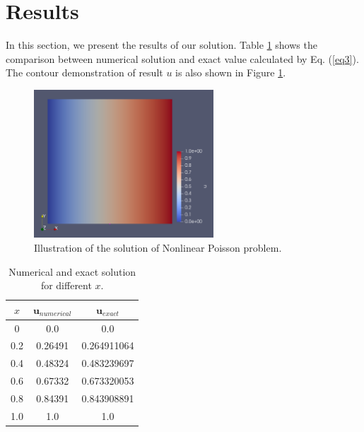 \documentclass[]{article}
\begin{document}
\section{Results} \label{sec: rst}
In this section, we present the results of our solution. Table \ref{tab1} shows the comparison between numerical solution and exact value calculated by Eq. (\ref{eq3}). The contour demonstration of result $u$ is also shown in Figure \ref{fig_Rs}.

\begin{figure}[htbp]
	\centering
	\includegraphics[width=0.6\textwidth]{Figures/result.png}
	\caption{Illustration of the solution of Nonlinear Poisson problem.}
	\label{fig_Rs}
\end{figure}
\begin{table}
	\caption{Numerical and exact solution for different $x$.}
	\label{tab1}
	\begin{center}
		\begin{tabular}{|c| c| c|} 
			\hline
			$x$ & $\mathbf{u}_{numerical}$ & $\mathbf{u}_{exact}$ \\ [0.7ex] 
			\hline\hline
			0 & 0.0 & 0.0 \\  [0.2ex] 
			\hline
			0.2 & 0.26491 & 0.264911064 \\ [0.2ex] 
			\hline
			0.4 & 0.48324 & 0.483239697 \\ [0.2ex] 
			\hline
			0.6 & 0.67332 & 0.673320053 \\ [0.2ex] 
			\hline
			0.8 & 0.84391 & 0.843908891 \\ [0.2ex] 
			\hline
			1.0 & 1.0 & 1.0 \\ [0.2ex] 
			\hline
		\end{tabular}
	\end{center}
\end{table}








\end{document}
